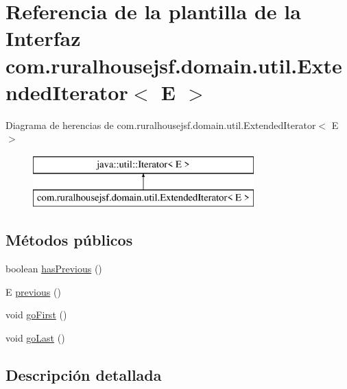 \hypertarget{interfacecom_1_1ruralhousejsf_1_1domain_1_1util_1_1_extended_iterator}{}\section{Referencia de la plantilla de la Interfaz com.\+ruralhousejsf.\+domain.\+util.\+Extended\+Iterator$<$ E $>$}
\label{interfacecom_1_1ruralhousejsf_1_1domain_1_1util_1_1_extended_iterator}
Diagrama de herencias de com.\+ruralhousejsf.\+domain.\+util.\+Extended\+Iterator$<$ E $>$\begin{figure}[H]
\begin{center}
\leavevmode
\includegraphics[height=2.000000cm]{interfacecom_1_1ruralhousejsf_1_1domain_1_1util_1_1_extended_iterator}
\end{center}
\end{figure}
\subsection*{Métodos públicos}
\begin{DoxyCompactItemize}
\item 
boolean \mbox{\hyperlink{interfacecom_1_1ruralhousejsf_1_1domain_1_1util_1_1_extended_iterator_a8aa41cc3f69db973663cf92a484579a9}{has\+Previous}} ()
\item 
E \mbox{\hyperlink{interfacecom_1_1ruralhousejsf_1_1domain_1_1util_1_1_extended_iterator_a4c9f9f5da6e96c08bc44d55517689397}{previous}} ()
\item 
void \mbox{\hyperlink{interfacecom_1_1ruralhousejsf_1_1domain_1_1util_1_1_extended_iterator_a1a2554fbed6834a638e31a23b739a684}{go\+First}} ()
\item 
void \mbox{\hyperlink{interfacecom_1_1ruralhousejsf_1_1domain_1_1util_1_1_extended_iterator_a055883d2a28df4ac0da7476a2a773f36}{go\+Last}} ()
\end{DoxyCompactItemize}


\subsection{Descripción detallada}


